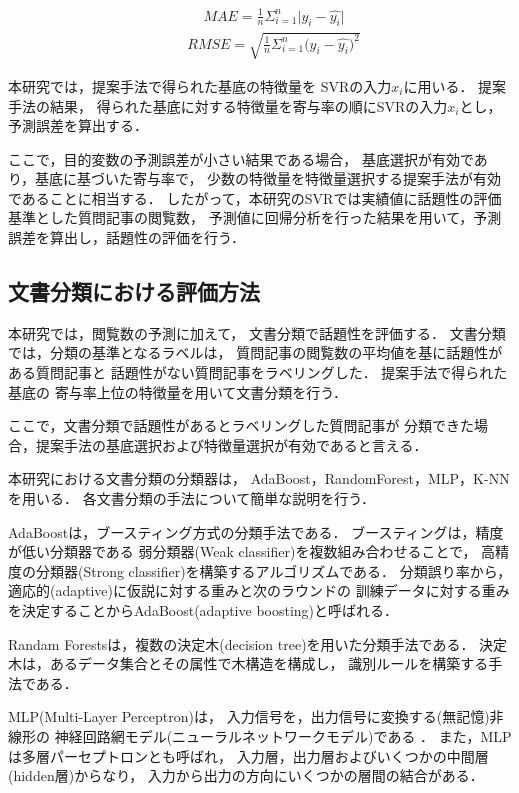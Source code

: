 \documentclass[12pt,a4paper,twocolumn,twoside]{jsik}
\begin{document}
\begin{eqnarray}
\label{math_mae}
\qquad MAE = \frac{1}{n}  \Sigma_{i=1}^{n}\big|{y}_i -   \widehat{{y}_i}  \big|
\end{eqnarray}
%
\begin{eqnarray}
\label{math_rmse}
\qquad RMSE = \sqrt{ \frac{1}{n}  \Sigma_{i=1}^{n} \big({y}_i -   \widehat{{y}_i}  )^2  } 
\end{eqnarray}

本研究では，提案手法で得られた基底の特徴量を
SVRの入力$x_{i}$に用いる．
%
提案手法の結果，
得られた基底に対する特徴量を寄与率の順にSVRの入力$x_{i}$とし，
予測誤差を算出する．

\newpage
ここで，目的変数の予測誤差が小さい結果である場合，
基底選択が有効であり，基底に基づいた寄与率で，
少数の特徴量を特徴量選択する提案手法が有効であることに相当する．
%
したがって，本研究のSVRでは実績値に話題性の評価基準とした質問記事の閲覧数，
予測値に回帰分析を行った結果を用いて，予測誤差を算出し，話題性の評価を行う．

\subsection{文書分類における評価方法}
本研究では，閲覧数の予測に加えて，
文書分類で話題性を評価する．
%
文書分類では，分類の基準となるラベルは，
質問記事の閲覧数の平均値を基に話題性がある質問記事と
話題性がない質問記事をラベリングした．
%
提案手法で得られた基底の
寄与率上位の特徴量を用いて文書分類を行う．

ここで，文書分類で話題性があるとラベリングした質問記事が
分類できた場合，提案手法の基底選択および特徴量選択が有効であると言える．

本研究における文書分類の分類器は，
AdaBoost，RandomForest，MLP，K-NNを用いる．
各文書分類の手法について簡単な説明を行う．

AdaBoostは，ブースティング方式の分類手法である．
ブースティングは，精度が低い分類器である
弱分類器(Weak classifier)を複数組み合わせることで，
高精度の分類器(Strong classifier)を構築するアルゴリズムである．
%
分類誤り率から，適応的(adaptive)に仮説に対する重みと次のラウンドの
訓練データに対する重みを決定することからAdaBoost(adaptive boosting)と呼ばれる\cite{text_classification_showcase}．

Randam Forestsは，複数の決定木(decision tree)を用いた分類手法である\cite{pattern_recognition_randomforests}．
決定木は，あるデータ集合とその属性で木構造を構成し，
識別ルールを構築する手法である．

MLP(Multi-Layer Perceptron)は，
入力信号を，出力信号に変換する(無記憶)非線形の
神経回路網モデル(ニューラルネットワークモデル)である
\cite{natural_gradient_learning}．
%
また，MLPは多層パーセプトロンとも呼ばれ，
入力層，出力層およびいくつかの中間層(hidden層)からなり，
入力から出力の方向にいくつかの層間の結合がある．
\end{document}
